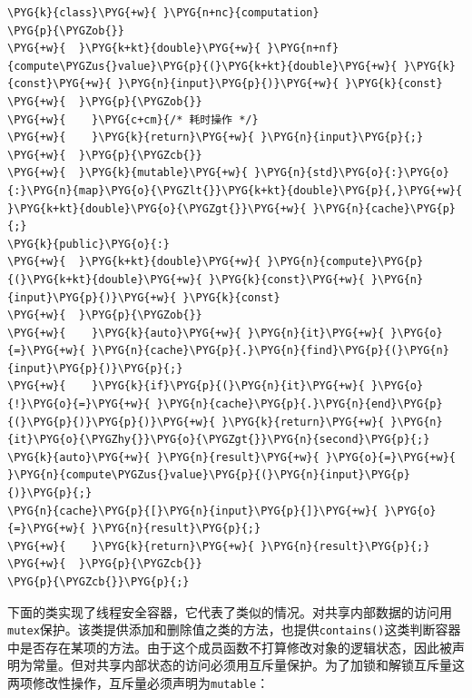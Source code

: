 \begin{codeblockbg}
\begin{Verbatim}[commandchars=\\\{\},breaklines=true,breakanywhere=true,fontsize=\codefont,xleftmargin=17bp]
\PYG{k}{class}\PYG{+w}{ }\PYG{n+nc}{computation}
\PYG{p}{\PYGZob{}}
\PYG{+w}{  }\PYG{k+kt}{double}\PYG{+w}{ }\PYG{n+nf}{compute\PYGZus{}value}\PYG{p}{(}\PYG{k+kt}{double}\PYG{+w}{ }\PYG{k}{const}\PYG{+w}{ }\PYG{n}{input}\PYG{p}{)}\PYG{+w}{ }\PYG{k}{const}
\PYG{+w}{  }\PYG{p}{\PYGZob{}}
\PYG{+w}{    }\PYG{c+cm}{/* 耗时操作 */}
\PYG{+w}{    }\PYG{k}{return}\PYG{+w}{ }\PYG{n}{input}\PYG{p}{;}
\PYG{+w}{  }\PYG{p}{\PYGZcb{}}
\PYG{+w}{  }\PYG{k}{mutable}\PYG{+w}{ }\PYG{n}{std}\PYG{o}{:}\PYG{o}{:}\PYG{n}{map}\PYG{o}{\PYGZlt{}}\PYG{k+kt}{double}\PYG{p}{,}\PYG{+w}{ }\PYG{k+kt}{double}\PYG{o}{\PYGZgt{}}\PYG{+w}{ }\PYG{n}{cache}\PYG{p}{;}
\PYG{k}{public}\PYG{o}{:}
\PYG{+w}{  }\PYG{k+kt}{double}\PYG{+w}{ }\PYG{n}{compute}\PYG{p}{(}\PYG{k+kt}{double}\PYG{+w}{ }\PYG{k}{const}\PYG{+w}{ }\PYG{n}{input}\PYG{p}{)}\PYG{+w}{ }\PYG{k}{const}
\PYG{+w}{  }\PYG{p}{\PYGZob{}}
\PYG{+w}{    }\PYG{k}{auto}\PYG{+w}{ }\PYG{n}{it}\PYG{+w}{ }\PYG{o}{=}\PYG{+w}{ }\PYG{n}{cache}\PYG{p}{.}\PYG{n}{find}\PYG{p}{(}\PYG{n}{input}\PYG{p}{)}\PYG{p}{;}
\PYG{+w}{    }\PYG{k}{if}\PYG{p}{(}\PYG{n}{it}\PYG{+w}{ }\PYG{o}{!}\PYG{o}{=}\PYG{+w}{ }\PYG{n}{cache}\PYG{p}{.}\PYG{n}{end}\PYG{p}{(}\PYG{p}{)}\PYG{p}{)}\PYG{+w}{ }\PYG{k}{return}\PYG{+w}{ }\PYG{n}{it}\PYG{o}{\PYGZhy{}}\PYG{o}{\PYGZgt{}}\PYG{n}{second}\PYG{p}{;}
\PYG{k}{auto}\PYG{+w}{ }\PYG{n}{result}\PYG{+w}{ }\PYG{o}{=}\PYG{+w}{ }\PYG{n}{compute\PYGZus{}value}\PYG{p}{(}\PYG{n}{input}\PYG{p}{)}\PYG{p}{;}
\PYG{n}{cache}\PYG{p}{[}\PYG{n}{input}\PYG{p}{]}\PYG{+w}{ }\PYG{o}{=}\PYG{+w}{ }\PYG{n}{result}\PYG{p}{;}
\PYG{+w}{    }\PYG{k}{return}\PYG{+w}{ }\PYG{n}{result}\PYG{p}{;}
\PYG{+w}{  }\PYG{p}{\PYGZcb{}}
\PYG{p}{\PYGZcb{}}\PYG{p}{;}
\end{Verbatim}
\end{codeblockbg}



下面的类实现了线程安全容器，它代表了类似的情况。对共享内部数据的访问用\texttt{mutex}保护。该类提供添加和删除值之类的方法，也提供\texttt{contains()}这类判断容器中是否存在某项的方法。由于这个成员函数不打算修改对象的逻辑状态，因此被声明为常量。但对共享内部状态的访问必须用互斥量保护。为了加锁和解锁互斥量这两项修改性操作，互斥量必须声明为\texttt{mutable}：



